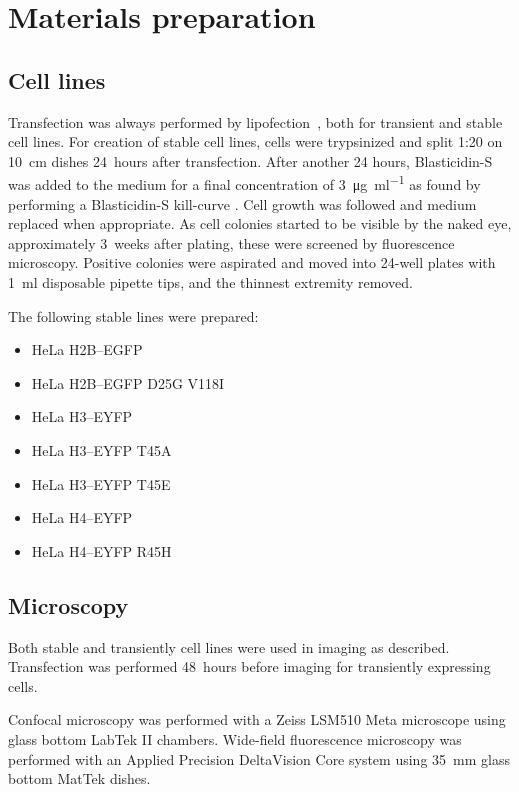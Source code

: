 \section{Materials preparation}

  \subsection{Cell lines}

    Transfection was always performed by lipofection~,
    both for transient and stable cell lines. For creation of stable cell lines,
    cells were trypsinized and split 1:20 on \SI{10}{\cm} dishes 24~hours after transfection.
    After another 24 hours, Blasticidin-S was added to the medium for
    a final concentration of \SI{3}{\ug\per\ml} as found by performing a
    Blasticidin-S kill-curve .
    Cell growth was followed and medium replaced when appropriate.
    As cell colonies started to be visible by the naked eye, approximately
    3~weeks after plating, these were screened by fluorescence microscopy.
    Positive colonies were aspirated and moved into 24-well plates with
    \SI{1}{\ml} disposable pipette tips, and the thinnest extremity removed.

    The following stable lines were prepared:

    \begin{itemize}
      \item HeLa H2B--EGFP
      \item HeLa H2B--EGFP D25G V118I
      \item HeLa H3--EYFP
      \item HeLa H3--EYFP T45A
      \item HeLa H3--EYFP T45E
      \item HeLa H4--EYFP
      \item HeLa H4--EYFP R45H
    \end{itemize}

  \subsection{Microscopy}

    Both stable and transiently cell lines were used in imaging as described.
    Transfection was performed 48~hours before imaging for transiently
    expressing cells.

    Confocal microscopy was performed with a Zeiss LSM510 Meta microscope
    using glass bottom LabTek II chambers. Wide-field fluorescence microscopy
    was performed with an Applied Precision DeltaVision Core system
    using \SI{35}{\mm} glass bottom MatTek dishes.


